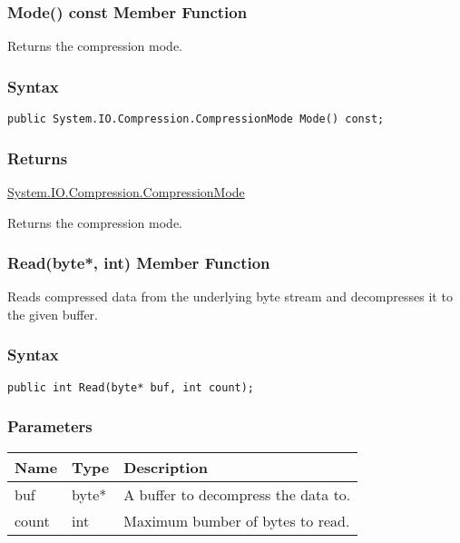 \documentclass[a4paper,oneside,11.000000pt]{book}
\begin{document}
\hypertarget{System.IO.Compression.DeflateStream.Mode.C.P.System.IO.Compression.DeflateStream}{\subsubsection*{Mode() const Member Function}}\begin{flushleft}
Returns the compression mode.

\end{flushleft}

\subsubsection*{Syntax}\texttt{public System.IO.Compression.CompressionMode Mode() const;}

\subsubsection*{Returns}
\hyperlink{System.IO.Compression.CompressionMode}{System.\-IO.\-Compression.\-CompressionMode}\begin{flushleft}
Returns the compression mode.

\end{flushleft}
\clearpage

\hypertarget{System.IO.Compression.DeflateStream.Read.P.System.IO.Compression.DeflateStream.P.byte.int}{\subsubsection*{Read(byte*, int) Member Function}}
\begin{flushleft}
Reads compressed data from the underlying byte stream and decompresses it to the given buffer.

\end{flushleft}
\subsubsection*{Syntax}\texttt{public int Read(byte* buf, int count);}

\subsubsection*{Parameters}
\begin{flushleft}
\begin{supertabular}[l]{lll}
\textbf{Name}
& \textbf{Type}
& \textbf{Description}
\\
\hline
buf
& byte*
& A buffer to decompress the data to.

\\
count
& int
& Maximum bumber of bytes to read.

\\
\end{supertabular}

\end{flushleft}
\end{document}
